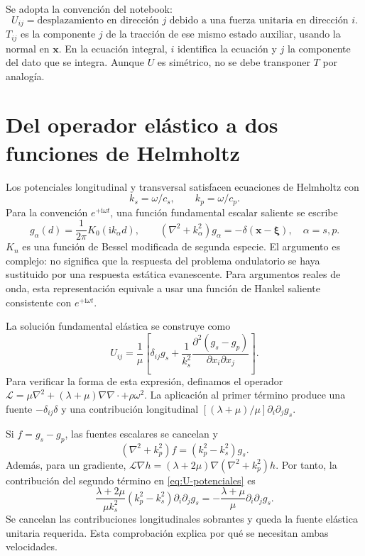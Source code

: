 \documentclass[11pt,a4paper]{report}
\numberwithin{equation}{chapter}
\newcommand{\vect}[1]{\bm{#1}}
\newcommand{\ii}{\mathrm{i}}
\begin{document}
Se adopta la convenci\'on del notebook:
\begin{equation}
 U_{ij}=\text{desplazamiento en direcci\'on }j
 \text{ debido a una fuerza unitaria en direcci\'on }i.
\end{equation}
$T_{ij}$ es la componente $j$ de la tracci\'on de ese mismo estado
auxiliar, usando la normal en $\vect x$. En la ecuaci\'on integral,
$i$ identifica la ecuaci\'on y $j$ la componente del dato que se integra.
Aunque $U$ es sim\'etrico, no se debe transponer $T$ por analog\'ia.

\section{Del operador el\'astico a dos funciones de Helmholtz}
Los potenciales longitudinal y transversal satisfacen ecuaciones de
Helmholtz con
\begin{equation}
 k_s=\omega/c_s,\qquad k_p=\omega/c_p.
\end{equation}
Para la convenci\'on $e^{+\ii\omega t}$, una funci\'on fundamental escalar
saliente se escribe
\begin{equation}
 g_\alpha(d)=\frac{1}{2\pi}K_0(\ii k_\alpha d),\qquad
 (\nabla^2+k_\alpha^2)g_\alpha=-\delta(\vect x-\vect\xi),
 \quad \alpha=s,p.
 \label{eq:green-escalar}
\end{equation}
$K_n$ es una funci\'on de Bessel modificada de segunda especie.
El argumento es complejo: no significa que la respuesta del problema
ondulatorio se haya sustituido por una respuesta est\'atica evanescente.
Para argumentos reales de onda, esta representaci\'on equivale a usar
una funci\'on de Hankel saliente consistente con $e^{+\ii\omega t}$.

La soluci\'on fundamental el\'astica se construye como
\begin{equation}
 U_{ij}=\frac1\mu\left[
 \delta_{ij}g_s+\frac1{k_s^2}
       \frac{\partial^2(g_s-g_p)}{\partial x_i\partial x_j}\right].
 \label{eq:U-potenciales}
\end{equation}
Para verificar la forma de esta expresi\'on, definamos el operador
$\mathcal L=\mu\nabla^2+(\lambda+\mu)\nabla\nabla\cdot+\rho\omega^2$.
La aplicaci\'on al primer t\'ermino produce una fuente
$-\delta_{ij}\delta$ y una contribuci\'on longitudinal
$[(\lambda+\mu)/\mu]\partial_i\partial_jg_s$.

Si $f=g_s-g_p$, las fuentes escalares se cancelan y
\begin{equation}
 (\nabla^2+k_p^2)f=(k_p^2-k_s^2)g_s.
\end{equation}
Adem\'as, para un gradiente,
$\mathcal L\nabla h=(\lambda+2\mu)\nabla(\nabla^2+k_p^2)h$.
Por tanto, la contribuci\'on del segundo t\'ermino en
\eqref{eq:U-potenciales} es
\begin{equation}
 \frac{\lambda+2\mu}{\mu k_s^2}
       (k_p^2-k_s^2)\partial_i\partial_jg_s
 =-\frac{\lambda+\mu}{\mu}\partial_i\partial_jg_s.
\end{equation}
Se cancelan las contribuciones longitudinales sobrantes y queda la
fuente el\'astica unitaria requerida. Esta comprobaci\'on explica por
qu\'e se necesitan ambas velocidades.
\end{document}
